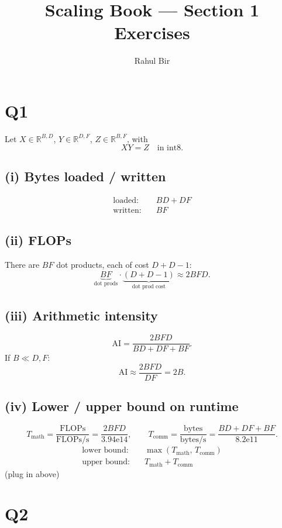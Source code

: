 \documentclass[11pt]{article}
\title{Scaling Book --- Section 1 Exercises}
\author{Rahul Bir}
\date{}
\newcommand{\flops}{\text{FLOPs}}
\newcommand{\flopss}{\text{FLOPs/s}}
\newcommand{\bytesps}{\text{bytes/s}}
\newcommand{\AI}{\mathrm{AI}}
\newcommand{\Tmath}{T_{\text{math}}}
\newcommand{\Tcomm}{T_{\text{comm}}}
\begin{document}
\maketitle

\section*{Q1}

Let $X \in \mathbb{R}^{B,D}$, $Y \in \mathbb{R}^{D,F}$, $Z \in \mathbb{R}^{B,F}$, with
\[
XY = Z \quad \text{in int8.}
\]

\subsection*{(i) Bytes loaded / written}
\begin{align*}
\text{loaded:} &\quad BD + DF \\
\text{written:} &\quad BF
\end{align*}

\subsection*{(ii) FLOPs}
There are $BF$ dot products, each of cost $D + D - 1$:
\[
\underbrace{BF}_{\text{dot prods}} \cdot \underbrace{(D + D - 1)}_{\text{dot prod cost}} \approx 2BFD.
\]

\subsection*{(iii) Arithmetic intensity}
\[
\AI = \frac{2BFD}{BD + DF + BF}.
\]
If $B \ll D, F$:
\[
\AI \approx \frac{2BFD}{DF} = 2B.
\]

\subsection*{(iv) Lower / upper bound on runtime}
\[
\Tmath = \frac{\flops}{\flopss} = \frac{2BFD}{3.94\mathrm{e}14},
\qquad
\Tcomm = \frac{\text{bytes}}{\bytesps} = \frac{BD + DF + BF}{8.2\mathrm{e}11}.
\]
\begin{align*}
\text{lower bound:} &\quad \max(\Tmath,\, \Tcomm) \\
\text{upper bound:} &\quad \Tmath + \Tcomm
\end{align*}
(plug in above)

\section*{Q2}
\end{document}

